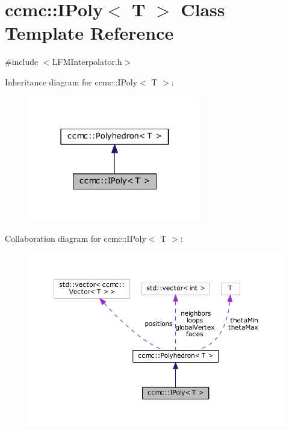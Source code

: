 \hypertarget{classccmc_1_1_i_poly}{\section{ccmc\-:\-:I\-Poly$<$ T $>$ Class Template Reference}
\label{classccmc_1_1_i_poly}
}


{\ttfamily \#include $<$L\-F\-M\-Interpolator.\-h$>$}



Inheritance diagram for ccmc\-:\-:I\-Poly$<$ T $>$\-:
\nopagebreak
\begin{figure}[H]
\begin{center}
\leavevmode
\includegraphics[width=214pt]{classccmc_1_1_i_poly__inherit__graph}
\end{center}
\end{figure}


Collaboration diagram for ccmc\-:\-:I\-Poly$<$ T $>$\-:
\nopagebreak
\begin{figure}[H]
\begin{center}
\leavevmode
\includegraphics[width=350pt]{classccmc_1_1_i_poly__coll__graph}
\end{center}
\end{figure}
